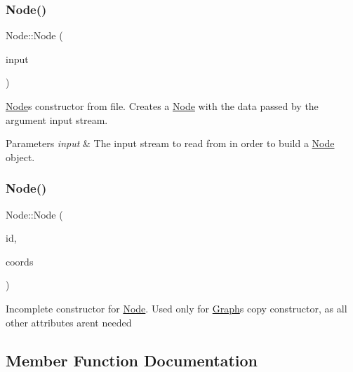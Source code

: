 \subsubsection{\texorpdfstring{Node()}{Node()}\hspace{0.1cm}{\footnotesize\ttfamily [1/2]}}
{\footnotesize\ttfamily Node\+::\+Node (\begin{DoxyParamCaption}\item[{istream \&}]{input }\end{DoxyParamCaption})}

\hyperlink{class_node}{Node}\textquotesingle{}s constructor from file. Creates a \hyperlink{class_node}{Node} with the data passed by the argument input stream.


\begin{DoxyParams}{Parameters}
{\em input} & The input stream to read from in order to build a \hyperlink{class_node}{Node} object. \\
\hline
\end{DoxyParams}
\hypertarget{class_node_aceb6d58ed1ee8fe95c532453a1f09ad2}{}\label{class_node_aceb6d58ed1ee8fe95c532453a1f09ad2} 
\subsubsection{\texorpdfstring{Node()}{Node()}\hspace{0.1cm}{\footnotesize\ttfamily [2/2]}}
{\footnotesize\ttfamily Node\+::\+Node (\begin{DoxyParamCaption}\item[{\hyperlink{_node_8hpp_a9d6265804805c2375068fd7484840dc6}{node\+\_\+id}}]{id,  }\item[{\hyperlink{class_geographic_coords}{Geographic\+Coords}}]{coords }\end{DoxyParamCaption})}

Incomplete constructor for \hyperlink{class_node}{Node}. Used only for \hyperlink{class_graph}{Graph}\textquotesingle{}s copy constructor, as all other attributes aren\textquotesingle{}t needed 

\subsection{Member Function Documentation}
\hypertarget{class_node_a9c981148bc1602d4388c6ea6428450c4}{}\label{class_node_a9c981148bc1602d4388c6ea6428450c4} 

